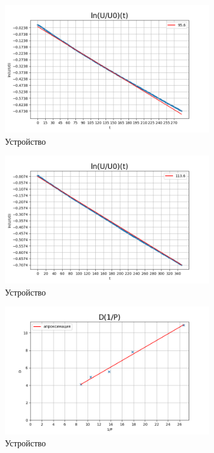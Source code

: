 \documentclass[a4paper]{article}
\begin{document}
\begin{figure}
    \centering
    \includegraphics[width=0.8\textwidth]{95_6.png}
    \caption{Устройство}
\end{figure}

\begin{figure}
    \centering
    \includegraphics[width=0.8\textwidth]{113_6.png}
    \caption{Устройство}
\end{figure}

\begin{figure}
    \centering
    \includegraphics[width=0.8\textwidth]{DP.png}
    \caption{Устройство}
\end{figure}
\end{document}
